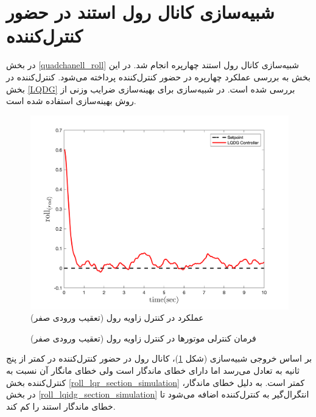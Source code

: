 \section{شبیه‌سازی کانال رول استند در حضور کنترل‌کننده }\label{roll_LQDG_section_simulation}
در بخش
\ref{quadchanell_roll}
شبیه‌سازی کانال رول استند چهارپره انجام شد. در این بخش به بررسی عملکرد چهارپره در حضور کنترل‌کننده  پرداخته می‌شود. کنترل‌کننده  در بخش
\ref{LQDG}
بررسی شده است.
 در شبیه‌سازی برای بهینه‌سازی ضرایب وزنی  از روش بهینه‌سازی
 \cite{Karimi2010}
استفاده شده است.
\begin{figure}[H]
	\includegraphics[width=.48\linewidth]{../Figures/MIL/LQDG/Roll/lqdg_roll.png}
	\centering
	\caption{عملكرد  در کنترل زاويه رول (تعقیب ورودی صفر)}
	\label{lqdg_roll_fig_simulation}
\end{figure}
\begin{figure}[H]
	\centering
	\caption{‫‪فرمان کنترلی موتورها در کنترل زاویه رول (تعقیب ورودی صفر)}
\end{figure}

بر اساس خروجی شبیه‌سازی (شکل
\ref{lqdg_roll_fig_simulation})،
کانال رول در حضور کنترل‌کننده  در کمتر از پنج ثانیه به تعادل می‌رسد اما دارای خطای ماندگار است ولی خطای 
مانگار آن نسبت به کنترل‌کننده
بخش
\ref{roll_lqr_section_simulation}
کمتر است. به دلیل خطای ماندگار، در بخش
\ref{roll_lqidg_section_simulation}
انتگرال‌گیر به کنترل‌کننده اضافه می‌شود تا خطای ماندگار استند را کم کند.
